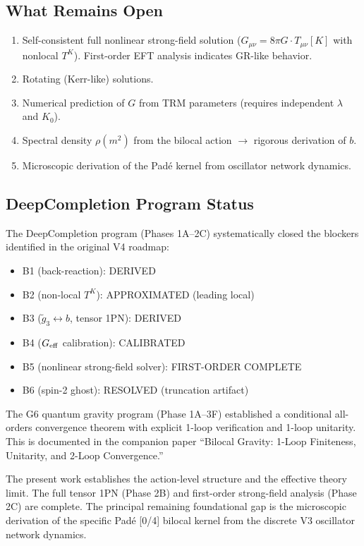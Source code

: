 \documentclass[12pt]{article}
\begin{document}
\subsection{What Remains Open}

\begin{enumerate}
\item Self-consistent full nonlinear strong-field solution ($G_{\mu\nu} = 8\pi G\cdot T_{\mu\nu}[K]$ with nonlocal $T^K$). First-order EFT analysis indicates GR-like behavior.
\item Rotating (Kerr-like) solutions.
\item Numerical prediction of $G$ from TRM parameters (requires independent $\lambda$ and $K_0$).
\item Spectral density $\rho(m^2)$ from the bilocal action $\to$ rigorous derivation of $b$.
\item Microscopic derivation of the Pad\'e kernel from oscillator network dynamics.
\end{enumerate}

\subsection{DeepCompletion Program Status}

The DeepCompletion program (Phases 1A--2C) systematically closed the blockers identified in the original V4 roadmap:
\begin{itemize}
\item B1 (back-reaction): DERIVED
\item B2 (non-local $T^K$): APPROXIMATED (leading local)
\item B3 ($\tilde{g}_3 \leftrightarrow b$, tensor 1PN): DERIVED
\item B4 ($G_{\rm eff}$ calibration): CALIBRATED
\item B5 (nonlinear strong-field solver): FIRST-ORDER COMPLETE
\item B6 (spin-2 ghost): RESOLVED (truncation artifact)
\end{itemize}

The G6 quantum gravity program (Phase 1A--3F) established a conditional all-orders convergence theorem with explicit 1-loop verification and 1-loop unitarity. This is documented in the companion paper ``Bilocal Gravity: 1-Loop Finiteness, Unitarity, and 2-Loop Convergence.''

The present work establishes the action-level structure and the effective theory limit. The full tensor 1PN (Phase 2B) and first-order strong-field analysis (Phase 2C) are complete. The principal remaining foundational gap is the microscopic derivation of the specific Pad\'e [0/4] bilocal kernel from the discrete V3 oscillator network dynamics.
\end{document}
